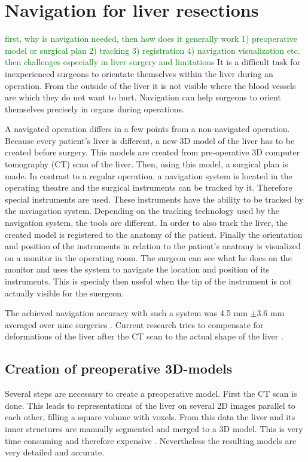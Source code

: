 \section{Navigation for liver resections}
\textcolor{green}{first, why is navigation needed, then how does it generally work
  1) preoperative model or surgical plan 2) tracking 3) registration 4)
  navigation visualization etc. then challenges especially in liver surgery and limitations}
It is a difficult task for inexperienced surgeons to orientate themselves within the liver during an operation.
From the outside of the liver it is not visible where the blood vessels are which they do not want to hurt.
Navigation can help surgeons to orient themselves precisely in organs during
operations.

A navigated operation differs in a few points from a non-navigated operation.
Because every patient's liver is different, a new 3D model of the liver has to
be created before surgery. This models are created from pre-operative 3D
computer tomography (CT) scan of the liver. Then, using this model, a surgical plan is made.
In contrast to a regular operation, a navigation system is located in the
operating theatre and the surgical instruments can be tracked by it. Therefore special instruments are used. These
instruments have the ability to be tracked by the naviagation system. Depending
on the tracking technology used by the navigation system, the tools are different.
In order to also track the liver, the created model is registered to the anatomy
of the patient. Finally the orientation and position
of the instruments in relation to the patient's anatomy is visualized on a
monitor in the operating room. The surgeon can see what he does on the
monitor and uses the system to navigate the location and position of its
instruments. This is specialy then useful when the tip of the instrument is not
actually visible for the suergeon.

The achieved
navigation accuracy with such a system was 4.5 mm $\pm$3.6 mm averaged over nine surgeries \cite{peterhans2011navigation}.
Current research tries to compensate for deformations of the liver after the CT
scan to the actual shape of the liver \cite{clements2017deformation}
\cite{clements2015validation}. 
\subsection{Creation of preoperative 3D-models}
Several steps are necessary to create a preoperative model. First the 
CT scan is done. This leads to representations of the liver on several 2D images parallel
to each other, filling a square volume with voxels. From this data the liver and
its inner structures are manually segmented and merged to a 3D model. This is very
time consuming and therefore expensive \cite{numminen2005preoperative}.
Nevertheless the resulting models are very detailed and accurate.    

